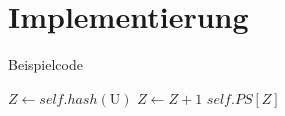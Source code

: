 \section{Implementierung}

\begin{frame}{Beispielcode}
        \begin{algorithmic}
                \State $Z \gets self.hash(\textrm{U})$
                    $Z \gets Z + 1$
                \EndWhile
                \State\Return $self.PS[Z]$
            \EndFunction
            \cite{github_knirschl}
        \end{algorithmic}
\end{frame}